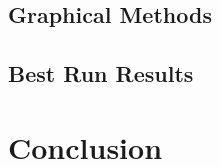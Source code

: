 \documentclass{article}
\begin{document}
\subsection{Graphical Methods}

\subsection{Best Run Results}

\section{Conclusion}
\end{document}
